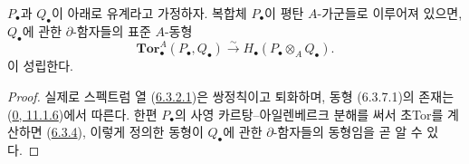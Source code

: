 \begin{proposition}[6.3.7]
\label{III.6.3.7-fr}
$P_\bullet$과 $Q_\bullet$이 아래로 유계라고 가정하자. 복합체
$P_\bullet$이 평탄 $A$-가군들로 이루어져 있으면, $Q_\bullet$에 관한
$\partial$-함자들의 표준 $A$-동형
\[
  \mathbf{Tor}_\bullet^A(P_\bullet,Q_\bullet)
  \xrightarrow{\sim}H_\bullet(P_\bullet\otimes_A Q_\bullet).
  \tag{6.3.7.1}\label{III.6.3.7.1.fr}
\]
이 성립한다.
\end{proposition}

\begin{proof}
실제로 스펙트럼 열 (\hyperref[III.6.3.2.1.fr]{6.3.2.1})은 쌍정칙이고
퇴화하며, 동형 (6.3.7.1)의 존재는
(\hyperref[0.11.1.6-fr]{0, 11.1.6})에서 따른다. 한편
$P_\bullet$의 사영 카르탕--아일렌베르크 분해를 써서 초Tor를 계산하면
(\hyperref[III.6.3.4-fr]{6.3.4}), 이렇게 정의한 동형이
$Q_\bullet$에 관한 $\partial$-함자들의 동형임을 곧 알 수 있다.
\end{proof}

